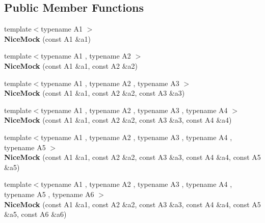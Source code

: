 \subsection*{Public Member Functions}
\begin{DoxyCompactItemize}
\item 
{\footnotesize template$<$typename A1 $>$ }\\{\bfseries Nice\+Mock} (const A1 \&a1)\hypertarget{classtesting_1_1NiceMock_a2d6b9cb9d929d1af4532b69c7ef19df6}{}\label{classtesting_1_1NiceMock_a2d6b9cb9d929d1af4532b69c7ef19df6}

\item 
{\footnotesize template$<$typename A1 , typename A2 $>$ }\\{\bfseries Nice\+Mock} (const A1 \&a1, const A2 \&a2)\hypertarget{classtesting_1_1NiceMock_a150837476e88f52772c8f85180b889a1}{}\label{classtesting_1_1NiceMock_a150837476e88f52772c8f85180b889a1}

\item 
{\footnotesize template$<$typename A1 , typename A2 , typename A3 $>$ }\\{\bfseries Nice\+Mock} (const A1 \&a1, const A2 \&a2, const A3 \&a3)\hypertarget{classtesting_1_1NiceMock_a0b91bd74b497626bb81d07c3d4b59d22}{}\label{classtesting_1_1NiceMock_a0b91bd74b497626bb81d07c3d4b59d22}

\item 
{\footnotesize template$<$typename A1 , typename A2 , typename A3 , typename A4 $>$ }\\{\bfseries Nice\+Mock} (const A1 \&a1, const A2 \&a2, const A3 \&a3, const A4 \&a4)\hypertarget{classtesting_1_1NiceMock_a5ffbe1a648f16612266d4e67a2d063d1}{}\label{classtesting_1_1NiceMock_a5ffbe1a648f16612266d4e67a2d063d1}

\item 
{\footnotesize template$<$typename A1 , typename A2 , typename A3 , typename A4 , typename A5 $>$ }\\{\bfseries Nice\+Mock} (const A1 \&a1, const A2 \&a2, const A3 \&a3, const A4 \&a4, const A5 \&a5)\hypertarget{classtesting_1_1NiceMock_a3812c0ba0d743f9a0c3d276dfc076f4c}{}\label{classtesting_1_1NiceMock_a3812c0ba0d743f9a0c3d276dfc076f4c}

\item 
{\footnotesize template$<$typename A1 , typename A2 , typename A3 , typename A4 , typename A5 , typename A6 $>$ }\\{\bfseries Nice\+Mock} (const A1 \&a1, const A2 \&a2, const A3 \&a3, const A4 \&a4, const A5 \&a5, const A6 \&a6)\hypertarget{classtesting_1_1NiceMock_a156d0fce85ac08abffdf4aa0c3975f81}{}\label{classtesting_1_1NiceMock_a156d0fce85ac08abffdf4aa0c3975f81}


\end{DoxyCompactItemize}
